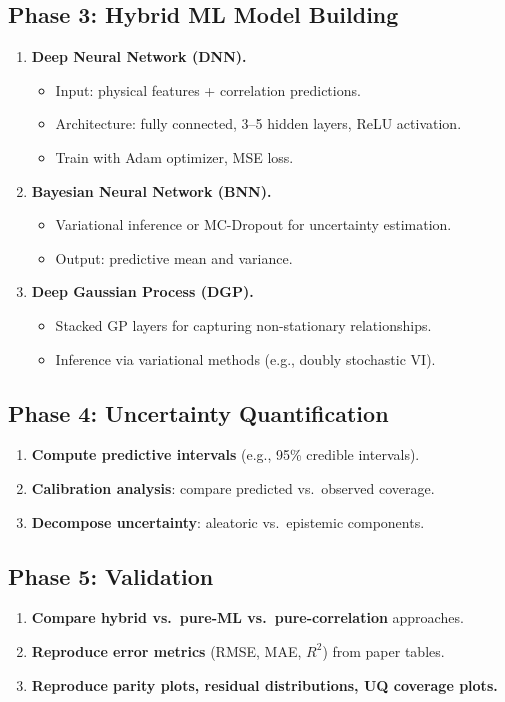 \documentclass[11pt,a4paper]{article}
\begin{document}
\subsection{Phase 3: Hybrid ML Model Building}
\begin{enumerate}[label=\textbf{3.\arabic*}]
  \item \textbf{Deep Neural Network (DNN).}
    \begin{itemize}
      \item Input: physical features + correlation predictions.
      \item Architecture: fully connected, 3--5 hidden layers, ReLU activation.
      \item Train with Adam optimizer, MSE loss.
    \end{itemize}
  \item \textbf{Bayesian Neural Network (BNN).}
    \begin{itemize}
      \item Variational inference or MC-Dropout for uncertainty estimation.
      \item Output: predictive mean and variance.
    \end{itemize}
  \item \textbf{Deep Gaussian Process (DGP).}
    \begin{itemize}
      \item Stacked GP layers for capturing non-stationary relationships.
      \item Inference via variational methods (e.g., doubly stochastic VI).
    \end{itemize}
\end{enumerate}

\subsection{Phase 4: Uncertainty Quantification}
\begin{enumerate}[label=\textbf{4.\arabic*}]
  \item \textbf{Compute predictive intervals} (e.g., 95\% credible intervals).
  \item \textbf{Calibration analysis}: compare predicted vs.\ observed coverage.
  \item \textbf{Decompose uncertainty}: aleatoric vs.\ epistemic components.
\end{enumerate}

\subsection{Phase 5: Validation}
\begin{enumerate}[label=\textbf{5.\arabic*}]
  \item \textbf{Compare hybrid vs.\ pure-ML vs.\ pure-correlation} approaches.
  \item \textbf{Reproduce error metrics} (RMSE, MAE, $R^2$) from paper tables.
  \item \textbf{Reproduce parity plots, residual distributions, UQ coverage plots.}
\end{enumerate}
\end{document}
